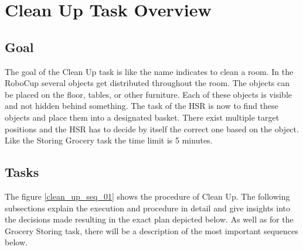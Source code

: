 \documentclass[main.tex]{subfiles}
\begin{document}
	\begingroup

	\renewcommand{\cleardoublepage}{}

	\renewcommand{\clearpage}{}

	\chapter{Clean Up Task Overview}

		
		\section{Goal}
		The goal of the Clean Up task is like the name indicates to clean a room. In the RoboCup several objects get distributed throughout the room. The objects can be placed on the floor, tables, or other furniture. Each of these objects is visible and not hidden behind something. The task of the HSR is now to find these objects and place them into a designated basket. There exist multiple target positions and the HSR has to decide by itself the correct one based on the object. Like the Storing Grocery task the time limit is 5 minutes.

	  	\section{Tasks}
	  	The figure \ref{clean_up_seq_01} shows the procedure of Clean Up. The following subsections explain the execution and procedure in detail and give insights into the decisions made resulting in the exact plan depicted below. As well as for the Grocery Storing task, there will be a description of the most important sequences below.
\end{document}
